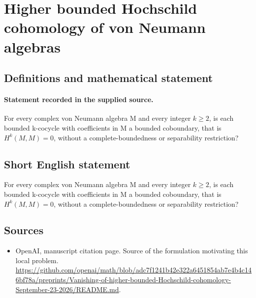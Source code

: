 \documentclass[11pt]{article}
\begin{document}
\section*{Higher bounded Hochschild cohomology of von Neumann algebras}\label{30007303}
\subsection{Definitions and mathematical statement}
\paragraph{Statement recorded in the supplied source.}
For every complex von Neumann algebra M and every integer $k\geq 2$, is each bounded k-cocycle with coefficients in M a bounded coboundary, that is $H^k(M,M)=0$, without a complete-boundedness or separability restriction?
\subsection{Short English statement}
For every complex von Neumann algebra M and every integer $k\geq 2$, is each bounded k-cocycle with coefficients in M a bounded coboundary, that is $H^k(M,M)=0$, without a complete-boundedness or separability restriction?
\subsection{Sources}
\begin{itemize}
\item[S1] OpenAI, manuscript citation page. Source of the formulation motivating this local problem.
\url{https://github.com/openai/math/blob/adc7f1241b42e322a6451854ab7e4b4c146bf78a/preprints/Vanishing-of-higher-bounded-Hochschild-cohomology-September-23-2026/README.md}.
\end{itemize}
\end{document}
